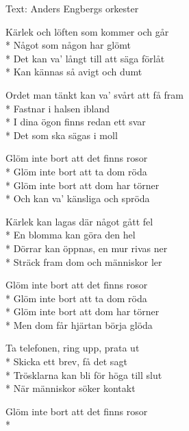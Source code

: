 \begin{SongText}
\begin{SongInfo}
    Text:  Anders Engbergs orkester
\end{SongInfo}
\begin{SongVerse}
Kärlek och löften som kommer och går\\*%
Något som någon har glömt\\*%
Det kan va’ långt till att säga förlåt\\*%
Kan kännas så avigt och dumt
\end{SongVerse}
\begin{SongVerse}
Ordet man tänkt kan va’ svårt att få fram\\*%
Fastnar i halsen ibland\\*%
I dina ögon finns redan ett svar\\*%
Det som ska sägas i moll
\end{SongVerse}
\begin{SongVerse}
Glöm inte bort att det finns rosor\\*%
Glöm inte bort att ta dom röda\\*%
Glöm inte bort att dom har törner\\*%
Och kan va’ känsliga och spröda
\end{SongVerse}
\begin{SongVerse}
Kärlek kan lagas där något gått fel\\*%
En blomma kan göra den hel\\*%
Dörrar kan öppnas, en mur rivas ner\\*%
Sträck fram dom och människor ler
\end{SongVerse}
\begin{SongVerse}
Glöm inte bort att det finns rosor\\*%
Glöm inte bort att ta dom röda\\*%
Glöm inte bort att dom har törner\\*%
Men dom får hjärtan börja glöda
\end{SongVerse}
\begin{SongVerse}
Ta telefonen, ring upp, prata ut\\*%
Skicka ett brev, få det sagt\\*%
Trösklarna kan bli för höga till slut\\*%
När människor söker kontakt
\end{SongVerse}
\begin{SongVerse}
Glöm inte bort att det finns rosor\\*%

\end{SongVerse}
\end{SongText}
